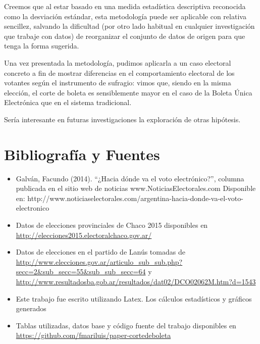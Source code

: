 \documentclass[12pt,a4paper]{article}
\begin{document}
Creemos que al estar basado en una medida estadística descriptiva reconocida
como la desviación estándar, esta metodología puede ser aplicable con relativa
sencillez, salvando la dificultad (por otro lado habitual en cualquier
investigación que trabaje con datos) de reorganizar el conjunto de datos de
origen para que tenga la forma sugerida.

Una vez presentada la metodología, pudimos aplicarla a un caso electoral
concreto a fin de mostrar diferencias en el comportamiento electoral de los
votantes según el instrumento de sufragio: vimos que, siendo en la misma
elección, el corte de boleta es sensiblemente mayor en el caso de la Boleta
Única Electrónica que en el sistema tradicional.

Sería interesante en futuras investigaciones la exploración de otras hipótesis.

\pagebreak

\section{Bibliografía y Fuentes}

\begin{itemize}
  \item Galván, Facundo (2014). “¿Hacia dónde va el voto electrónico?”, columna publicada en el sitio web de noticias www.NoticiasElectorales.com Disponible en: http://www.noticiaselectorales.com/argentina-hacia-donde-va-el-voto-electronico
  \item Datos de elecciones provinciales de Chaco 2015 disponibles en \url{http://elecciones2015.electoralchaco.gov.ar/}
  \item Datos de elecciones en el partido de Lanús tomadas de
    \url{http://www.elecciones.gov.ar/articulo_sub_sub.php?secc=2&sub_secc=55&sub_sub_secc=64}
    y \url{http://www.resultadosba.gob.ar/resultados/dat02/DCO02062M.htm?d=1543}
  \item Este trabajo fue escrito utilizando Latex. Los cálculos estadísticos y
    gráficos generados 
  \item Tablas utilizadas, datos base y código fuente del trabajo disponibles en \url{https://github.com/fmariluis/paper-cortedeboleta}
\end{itemize}


\tableofcontents

\listoftables
\end{document}
